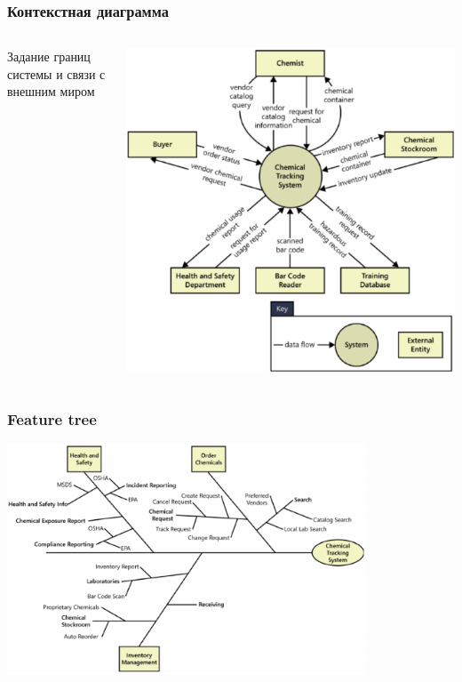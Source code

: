 \documentclass{../../slides-style}
\begin{document}
    \begin{frame}
        \frametitle{Контекстная диаграмма}
        \begin{columns}
            \begin{column}{0.4\textwidth}
                Задание границ системы и связи с внешним миром
            \end{column}
            \begin{column}{0.6\textwidth}
                \strut
                \includegraphics[width=\textwidth]{contextDiagram.png}
            \end{column}
        \end{columns}
    \end{frame}

    \begin{frame}
        \frametitle{Feature tree}
        \begin{center}
            \includegraphics[width=0.8\textwidth]{featureTree.png}
        \end{center}
    \end{frame}
\end{document}

